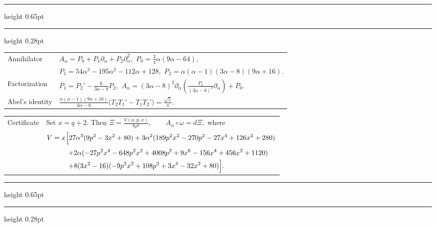 \documentclass[9pt]{extarticle}
\newcommand{\pa}{\partial_{\alpha}}
\newcommand{\DoubleRule}{\par\vspace{3pt}\hrule height 0.65pt\vspace{1.3pt}\hrule height 0.28pt\vspace{5.2pt}}
\begin{document}
\DoubleRule

{\fontsize{8.72}{10.65}\selectfont
\renewcommand{\arraystretch}{1.25}
\begin{tabularx}{\textwidth}{@{}H@{\hspace{0.10in}}Y@{}}
Annihilator &
$\displaystyle A_\alpha=P_0+P_1\pa+P_2\pa^2,$\qquad
$\displaystyle P_0=\frac34\alpha(9\alpha-64),$ \\
& $\displaystyle P_1=54\alpha^3-195\alpha^2-112\alpha+128,$\qquad
$\displaystyle P_2=\alpha(\alpha-1)(3\alpha-8)(9\alpha+16).$ \\[6pt]
Factorization &
$\displaystyle P_1=P_2'-\frac6{3\alpha-8}P_2,$
\qquad
$\displaystyle A_\alpha=(3\alpha-8)^2\pa\!\left(\frac{P_2}{(3\alpha-8)^2}\pa\right)+P_0.$ \\[6pt]
Abel's identity &
$\displaystyle
\frac{\alpha(\alpha-1)(9\alpha+16)}{3\alpha-8}
\bigl(T_2T_1'-T_1T_2'\bigr)=\frac{\sqrt5}{\pi}.$
\end{tabularx}
}

{\fontsize{7.72}{9.95}\selectfont
\renewcommand{\arraystretch}{1.16}
\begin{tabularx}{\textwidth}{@{}H@{\hspace{0.10in}}Y@{}}
Certificate &
Set $x=q+2$. Then
$\displaystyle \Xi=\frac{V(\alpha,p,x)}{8\rho^3},\qquad A_\alpha\circ\omega=d\Xi,$ where \\[2pt]
& $\displaystyle
V=x\Bigl[
27\alpha^3(9p^2-3x^2+80)
+3\alpha^2(189p^2x^2-270p^2-27x^4+126x^2+280)$ \\
& $\displaystyle\hspace{3.1em}
+2\alpha(-27p^2x^4-648p^2x^2+4008p^2+9x^6-156x^4+456x^2+1120)$ \\
& $\displaystyle\hspace{3.1em}
+8(3x^2-16)(-9p^2x^2+108p^2+3x^4-32x^2+80)
\Bigr].$
\end{tabularx}
}

\DoubleRule
\end{document}
